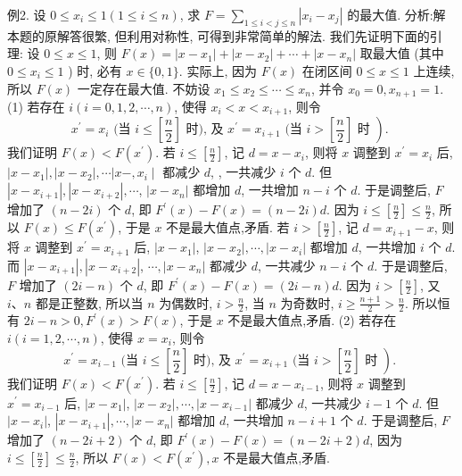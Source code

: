 例2. 设 $0 \leqslant x_i \leqslant 1(1 \leqslant i \leqslant n)$, 求 $F=\sum_{1 \leqslant i<j \leqslant n}\left|x_i-x_j\right|$ 的最大值.
分析:解本题的原解答很繁, 但利用对称性, 可得到非常简单的解法.
我们先证明下面的引理:
设 $0 \leqslant x \leqslant 1$, 则 $F(x)=\left|x-x_1\right|+\left|x-x_2\right|+\cdots+\left|x-x_n\right|$ 取最大值 (其中 $0 \leqslant x_i \leqslant 1$ ) 时, 必有 $x \in\{0,1\}$.
实际上, 因为 $F(x)$ 在闭区间 $0 \leqslant x \leqslant 1$ 上连续, 所以 $F(x)$ 一定存在最大值.
不妨设 $x_1 \leqslant x_2 \leqslant \cdots \leqslant x_n$, 并令 $x_0=0, x_{n+1}=1$.
(1) 若存在 $i(i=0,1,2, \cdots, n)$, 使得 $x_i<x<x_{i+1}$, 则令
$$
\left.x^{\prime}=x_i \text { (当 } i \leqslant\left[\frac{n}{2}\right] \text { 时), 及 } x^{\prime}=x_{i+1} \text { (当 } i>\left[\frac{n}{2}\right] \text { 时 }\right) \text {. }
$$
我们证明 $F(x)<F\left(x^{\prime}\right)$.
若 $i \leqslant\left[\frac{n}{2}\right]$, 记 $d=x-x_i$, 则将 $x$ 调整到 $x^{\prime}=x_i$ 后, $\left|x-x_1\right|, \mid x- x_2|, \cdots| x-,x_i \mid$ 都减少 $d$, , 一共减少 $i$ 个 $d$. 但 $\left|x-x_{i+1}\right|,\left|x-x_{i+2}\right|, \cdots$, $\left|x-x_n\right|$ 都增加 $d$, 一共增加 $n-i$ 个 $d$. 于是调整后, $F$ 增加了 $(n-2 i)$ 个 $d$, 即 $F^{\prime}(x)-F(x)=(n-2 i) d$. 因为 $i \leqslant\left[\frac{n}{2}\right] \leqslant \frac{n}{2}$, 所以 $F(x) \leqslant F\left(x^{\prime}\right)$, 于是 $x$ 不是最大值点,矛盾.
若 $i>\left[\frac{n}{2}\right]$, 记 $d=x_{i+1}-x$, 则将 $x$ 调整到 $x^{\prime}=x_{i+1}$ 后, $\left|x-x_1\right|$, $\left|x-x_2\right|, \cdots,\left|x-x_i\right|$ 都增加 $d$, 一共增加 $i$ 个 $d$. 而 $\left|x-x_{i+1}\right|,\left|x-x_{i+2}\right|$, $\cdots,\left|x-x_n\right|$ 都减少 $d$, 一共减少 $n-i$ 个 $d$. 于是调整后, $F$ 增加了 $(2 i-n)$ 个 $d$, 即 $F^{\prime}(x)-F(x)=(2 i-n) d$. 因为 $i>\left[\frac{n}{2}\right]$, 又 $i 、 n$ 都是正整数, 所以当 $n$ 为偶数时, $i>\frac{n}{2}$, 当 $n$ 为奇数时, $i \geqslant \frac{n+1}{2}>\frac{n}{2}$. 所以恒有 $2 i-n>0, F^{\prime}(x)>F(x)$, 于是 $x$ 不是最大值点,矛盾.
(2) 若存在 $i(i=1,2, \cdots, n)$, 使得 $x=x_i$, 则令
$$
\left.x^{\prime}=x_{i-1} \text { (当 } i \leqslant\left[\frac{n}{2}\right] \text { 时), 及 } x^{\prime}=x_{i+1} \text { (当 } i>\left[\frac{n}{2}\right] \text { 时 }\right) \text {. }
$$
我们证明 $F(x)<F\left(x^{\prime}\right)$.
若 $i \leqslant\left[\frac{n}{2}\right]$, 记 $d=x-x_{i-1}$, 则将 $x$ 调整到 $x^{\prime}=x_{i-1}$ 后, $\left|x-x_1\right|$, $\left|x-x_2\right|, \cdots,\left|x-x_{i-1}\right|$ 都减少 $d$, 一共减少 $i-1$ 个 $d$. 但 $\left|x-x_i\right|$, $\left|x-x_{i+1}\right|, \cdots,\left|x-x_n\right|$ 都增加 $d$, 一共增加 $n-i+1$ 个 $d$. 于是调整后, $F$ 增加了 $(n-2 i+2)$ 个 $d$, 即 $F^{\prime}(x)-F(x)=(n-2 i+2) d$, 因为 $i \leqslant\left[\frac{n}{2}\right] \leqslant \frac{n}{2}$, 所以 $F(x)<F\left(x^{\prime}\right), x$ 不是最大值点,矛盾.
